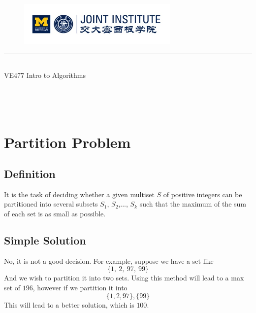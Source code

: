 \documentclass{article}
\begin{document}
\setmainfont{Cormorant Upright}
\renewcommand\arraystretch{1.5}


\thispagestyle{empty}

\begin{center}
\begin{large}
\begin{figure}[!htbp]
\centering
\includegraphics[width=0.7\textwidth]{Logo2}
\end{figure}
\hrule
\vspace*{0.25cm}
 \\
\Large  VE477 Intro to Algorithms\\
\end{large}
\hrulefill

\vspace*{3cm}

\begin{Large}
 \\
\end{Large}
\vspace*{2cm}
\begin{large}
 \\
\end{large}
\end{center}
\newpage
\setmainfont{Optima}
\setmonofont{Optima}
\setsansfont{Optima}
\setcounter{page}{1}
\section{Partition Problem}
\subsection{Definition}
It is the task of deciding whether a given multiset $S$ of positive integers can be partitioned into several subsets $S_1$, $S_2$,..., $S_k$ such that the maximum of the sum of each set is as small as possible.
\subsection{Simple Solution}
No, it is not a good decision. For example, suppose we have a set like \[
	\{1,\ 2, \ 97, \ 99 \}
\]
And we wish to partition it into two sets. Using this method will lead to a max set of $196$, however if we partition it into 
\[
	\{1,2,97\}, \{99\}
\]
This will lead to a better solution, which is $100$. 
\end{document}
